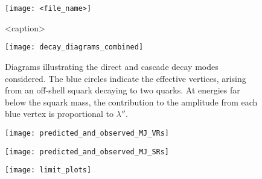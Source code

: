 
\begin{figure}[h]
\texttt{[image: <file\_name>]}
\caption{<caption>}
\label{fig:<figure_label>}
\end{figure}



\begin{figure}[h]
\texttt{[image: decay\_diagrams\_combined]}
\caption{Diagrams illustrating the direct and cascade decay modes considered. The blue circles indicate the effective vertices, arising from an off-shell squark decaying to two quarks. At energies far below the squark mass, the contribution to the amplitude from each blue vertex is proportional to $\lambda''$.}
\label{fig:decay_diagrams}
\end{figure}



\begin{figure}[h]
\texttt{[image: predicted\_and\_observed\_MJ\_VRs]}
\caption{}
\label{fig:pred_obs_MJ_VRs}
\end{figure}

\begin{figure}[h]
\texttt{[image: predicted\_and\_observed\_MJ\_SRs]}
\caption{}
\label{fig:pred_obs_MJ_SRs}
\end{figure}

\begin{figure}[h]
\texttt{[image: limit\_plots]}
\caption{}
\label{fig:limits}
\end{figure}
